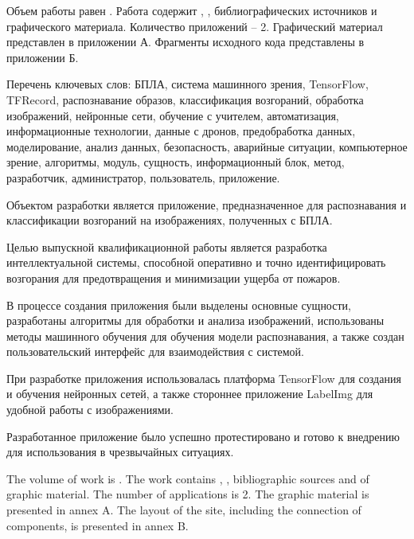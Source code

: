 
Объем работы равен . Работа содержит , ,  библиографических источников и  графического материала. Количество приложений – 2. Графический материал представлен в приложении А. Фрагменты исходного кода представлены в приложении Б.

Перечень ключевых слов: БПЛА, система машинного зрения, TensorFlow, TFRecord, распознавание образов, классификация возгораний, обработка изображений, нейронные сети, обучение с учителем, автоматизация, информационные технологии, данные с дронов, предобработка данных, моделирование, анализ данных, безопасность, аварийные ситуации, компьютерное зрение, алгоритмы, модуль, сущность, информационный блок, метод, разработчик, администратор, пользователь, приложение.

Объектом разработки является приложение, предназначенное для распознавания и классификации возгораний на изображениях, полученных с БПЛА.

Целью выпускной квалификационной работы является разработка интеллектуальной системы, способной оперативно и точно идентифицировать возгорания для предотвращения и минимизации ущерба от пожаров.

В процессе создания приложения были выделены основные сущности, разработаны алгоритмы для обработки и анализа изображений, использованы методы машинного обучения для обучения модели распознавания, а также создан пользовательский интерфейс для взаимодействия с системой.

При разработке приложения использовалась платформа TensorFlow для создания и обучения нейронных сетей, а также стороннее приложение LabelImg для удобной работы с изображениями.

Разработанное приложение было успешно протестировано и готово к внедрению для использования в чрезвычайных ситуациях.

  
The volume of work is . The work contains , ,  bibliographic sources and  of graphic material. The number of applications is 2. The graphic material is presented in annex A. The layout of the site, including the connection of components, is presented in annex B.

